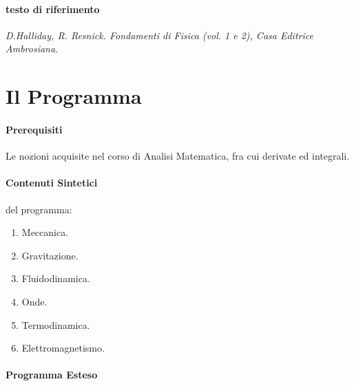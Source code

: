 \documentclass[12pt, a4paper, openany]{book}
\begin{document}
\paragraph*{testo di riferimento} \emph{D.Halliday, R. Resnick. Fondamenti di Fisica (vol. 1 e 2), Casa Editrice Ambrosiana}.

\section{Il Programma}
\paragraph*{Prerequisiti} Le nozioni acquisite nel corso di Analisi Matematica, fra cui derivate ed integrali.

\paragraph*{Contenuti Sintetici} del programma:
\begin{enumerate}
    \item Meccanica.
    \item Gravitazione.
    \item Fluidodinamica.
    \item Onde.
    \item Termodinamica.
    \item Elettromagnetismo.
\end{enumerate}

\paragraph*{Programma Esteso}
\end{document}
